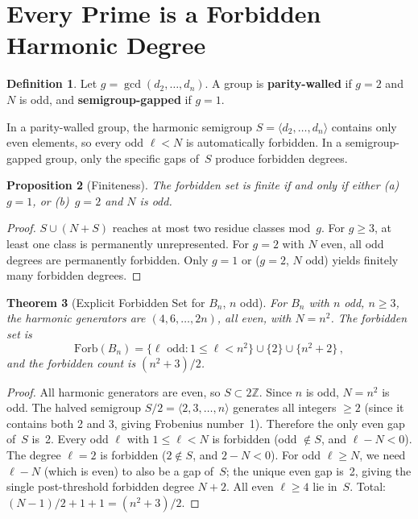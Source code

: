 \documentclass[11pt,letterpaper]{article}
\newtheorem{theorem}{Theorem}[section]
\newtheorem{proposition}[theorem]{Proposition}
\theoremstyle{definition}
\newtheorem{definition}[theorem]{Definition}
\newcommand{\Forb}{\mathrm{Forb}}
\newcommand{\ZZ}{\mathbb{Z}}
\newcommand{\gen}[1]{\langle #1 \rangle}
\begin{document}
\section{Every Prime is a Forbidden Harmonic Degree}\label{sec:universal}
\begin{definition}\label{def:parity}
Let $g=\gcd(d_2,\dots,d_n)$.  A group is \textbf{parity-walled} if $g=2$ and $N$ is odd, and \textbf{semigroup-gapped} if $g=1$.
\end{definition}
In a parity-walled group, the harmonic semigroup $S=\gen{d_2,\dots,d_n}$ contains only even elements, so every odd $\ell<N$ is automatically forbidden.  In a semigroup-gapped group, only the specific gaps of~$S$ produce forbidden degrees.
\begin{proposition}[Finiteness]\label{prop:finite}
The forbidden set is finite if and only if either \textup{(a)}~$g=1$, or \textup{(b)}~$g=2$ and $N$ is odd.
\end{proposition}
\begin{proof}
$S\cup(N+S)$ reaches at most two residue classes mod~$g$.  For $g\ge3$, at least one class is permanently unrepresented.  For $g=2$ with $N$ even, all odd degrees are permanently forbidden.  Only $g=1$ or ($g=2$, $N$ odd) yields finitely many forbidden degrees.
\end{proof}
\begin{theorem}[Explicit Forbidden Set for $B_n$, $n$ odd]\label{thm:Bn}
For $B_n$ with $n$ odd, $n\ge3$, the harmonic generators are $(4,6,\dots,2n)$, all even, with $N=n^2$.  The forbidden set is
\[
  \Forb(B_n) = \{\ell\text{ odd}: 1\le\ell<n^2\}\cup\{2\}\cup\{n^2+2\}\,,
\]
and the forbidden count is $(n^2+3)/2$.
\end{theorem}
\begin{proof}
All harmonic generators are even, so $S\subset 2\ZZ$.  Since $n$ is odd, $N=n^2$ is odd.  The halved semigroup $S/2=\gen{2,3,\dots,n}$ generates all integers $\ge2$ (since it contains both 2 and 3, giving Frobenius number~1).  Therefore the only even gap of~$S$ is~2.
Every odd $\ell$ with $1\le\ell<N$ is forbidden (odd $\notin S$, and $\ell-N<0$).  The degree $\ell=2$ is forbidden ($2\notin S$, and $2-N<0$).  For odd $\ell\ge N$, we need $\ell-N$ (which is even) to also be a gap of~$S$; the unique even gap is~2, giving the single post-threshold forbidden degree $N+2$.  All even $\ell\ge4$ lie in~$S$.
Total: $(N-1)/2+1+1=(n^2+3)/2$.
\end{proof}
\end{document}
